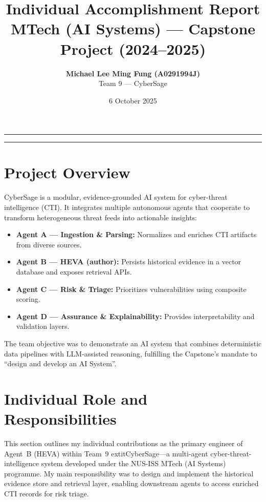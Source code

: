 \documentclass[12pt,a4paper]{article}
\title{\textbf{Individual Accomplishment Report}\\[4pt]
\large MTech (AI Systems) — Capstone Project (2024–2025)}
\author{
\textbf{Michael Lee Ming Fung (A0291994J)}\\
Team 9 — CyberSage\\
}
\date{6 October 2025}
\begin{document}
\maketitle
\vspace{0.5em}\hrule\vspace{1em}




\vspace{1em}\hrule\vspace{1em}

\section{Project Overview}
\label{sec:overview}
CyberSage is a modular, evidence-grounded AI system for cyber-threat intelligence (CTI). It integrates multiple autonomous agents that cooperate to transform heterogeneous threat feeds into actionable insights:
\begin{itemize}[noitemsep]
    \item \textbf{Agent A — Ingestion \& Parsing:} Normalizes and enriches CTI artifacts from diverse sources.
    \item \textbf{Agent B — HEVA (author):} Persists historical evidence in a vector database and exposes retrieval APIs.
    \item \textbf{Agent C — Risk \& Triage:} Prioritizes vulnerabilities using composite scoring.
    \item \textbf{Agent D — Assurance \& Explainability:} Provides interpretability and validation layers.
\end{itemize}
The team objective was to demonstrate an AI system that combines deterministic data pipelines with LLM-assisted reasoning, fulfilling the Capstone’s mandate to ``design and develop an AI System''.

\section{Individual Role and Responsibilities}
\label{sec:role}
This section outlines my individual contributions as the primary engineer of Agent~B (HEVA) within Team~9 	extit{CyberSage}—a multi-agent cyber-threat-intelligence system developed under the NUS-ISS MTech (AI Systems) programme. My main responsibility was to design and implement the historical evidence store and retrieval layer, enabling downstream agents to access enriched CTI records for risk triage.
\end{document}
